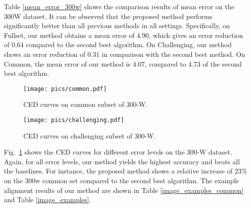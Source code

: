 \documentclass[journal]{IEEEtran}
\begin{document}
Table \ref{mean_error_300w} shows the comparison results of mean error on the 300W dataset. It can be observed that the proposed method performs significantly better than all previous methods in all settings. Specifically, on Fullset, our method obtains a mean error of 4.90, which gives an error reduction of $0.64$ compared to the second best algorithm. On Challenging, our method shows an error reduction of $0.31$ in comparison with the second best method. On Common, the mean error of our method is 4.07, compared to 4.73 of the second best algorithm.

\begin{figure}
\centering
    \texttt{[image: pics/common.pdf]}
  \caption{CED curves on common subset of 300-W.}
  \label{ced_common}  %
\end{figure}

\begin{figure}
\centering
    \texttt{[image: pics/challenging.pdf]}
  \caption{CED curves on challenging subset of 300-W.}
  \label{ced_challenge}  %
\end{figure}
Fig.~\ref{ced_common} shows the CED curves for different error levels on the 300-W dataset. Again, for all error levels, our method yields the highest accuracy and beats all the baselines.
For instance, the proposed method shows a relative increase of $23\%$ on the 300w common set compared to the second best algorithm. The example alignment results of our method are shown in Table \ref{image_examples_common} and Table \ref{image_examples}.
\end{document}
